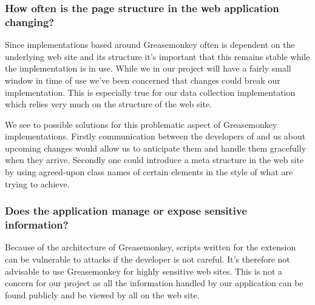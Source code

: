 \subsubsection{How often is the page structure in the web application
  changing?}

Since implementations based around Greasemonkey often is dependent on the
underlying web site and its structure it's important that this remains
stable while the implementation is in use. While we in our project
will have a fairly small window in time of use we've been concerned
that changes could break our implementation. This is especially true
for our data collection implementation which relies very much on the structure
of the \urort{} web site.

We see to possible solutions for this problematic aspect of Greasemonkey
implementations. Firstly communication between the developers of
\urort{} and us about upcoming changes would allow us to anticipate
them and handle them gracefully when they arrive. Secondly one could
introduce a meta structure in the web site by using agreed-upon
class names of certain  elements in the style of
what %
are trying to achieve.

\subsubsection{Does the application manage or expose sensitive information?}

Because of the architecture of Greasemonkey, scripts written for the extension
can be vulnerable to attacks if the developer is not careful. It's
therefore not advisable to use Greasemonkey for highly sensitive web sites.
This is not a concern for our project as all the information handled by our
application can be found publicly and be viewed by all on the \urort{}
web site.

